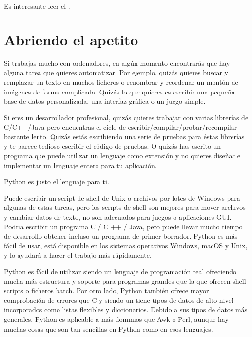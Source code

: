 \documentclass[a4,10pt,spanish]{sphinxmanual}
\begin{document}
\sphinxAtStartPar
Es interesante leer el {\hyperref[\detokenize{glossary:glossary}]{}}.


\chapter{Abriendo el apetito}
\label{\detokenize{tutorial/appetite:whetting-your-appetite}}\label{\detokenize{tutorial/appetite:tut-intro}}\label{\detokenize{tutorial/appetite::doc}}
\sphinxAtStartPar
Si trabajas mucho con ordenadores, en algún momento encontrarás que hay alguna tarea que quieres automatizar. Por ejemplo, quizás quieres buscar y remplazar un texto en muchos ficheros o renombrar y reordenar un montón de imágenes de forma complicada. Quizás lo que quieres es escribir una pequeña base de datos personalizada, una interfaz gráfica o un juego simple.

\sphinxAtStartPar
Si eres un desarrollador profesional, quizás quieres trabajar con varias librerías de C/C++/Java pero encuentras el ciclo de escribir/compilar/probar/recompilar bastante lento. Quizás estás escribiendo una serie de pruebas para éstas librerías y te parece tedioso escribir el código de pruebas. O quizás has escrito un programa que puede utilizar un lenguaje como extensión y no quieres diseñar e implementar un lenguaje entero para tu aplicación.

\sphinxAtStartPar
Python es justo el lenguaje para ti.

\sphinxAtStartPar
Puede escribir un script de shell de Unix o archivos por lotes de Windows para algunas de estas tareas, pero los scripts de shell son mejores para mover archivos y cambiar datos de texto, no son adecuados para juegos o aplicaciones GUI. Podría escribir un programa C / C ++ / Java, pero puede llevar mucho tiempo de desarrollo obtener incluso un programa de primer borrador. Python es más fácil de usar, está disponible en los sistemas operativos Windows, macOS y Unix, y lo ayudará a hacer el trabajo más rápidamente.

\sphinxAtStartPar
Python es fácil de utilizar siendo un lenguaje de programación real ofreciendo mucha más estructura y soporte para programas grandes que la que ofrecen shell scripts o ficheros batch. Por otro lado, Python también ofrece mayor comprobación de errores que C y siendo un  tiene tipos de datos de alto nivel incorporados como listas flexibles y diccionarios. Debido a sus tipos de datos más generales, Python es aplicable a más dominios que Awk o Perl, aunque hay muchas cosas que son tan sencillas en Python como en esos lenguajes.
\end{document}
